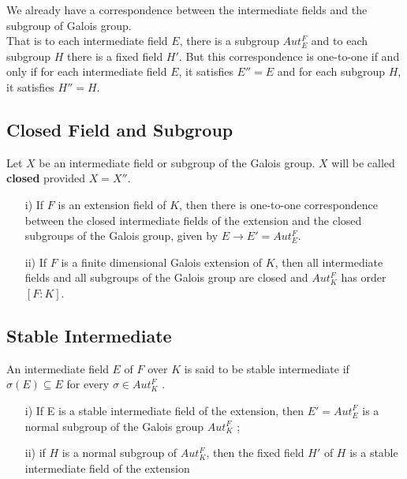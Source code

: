 \vspace{2mm}
We already have a correspondence between the intermediate fields and the subgroup of Galois group.\\
That is to each intermediate field \(E\), there is a subgroup \(Aut_E^F\) and to each subgroup \(H\) there is a fixed field \(H'\). But this correspondence is one-to-one if and only if for each intermediate field \(E\), it satisfies \(E''=E\) and for each subgroup \(H\), it satisfies \(H''=H\).

\subsection{Closed Field and Subgroup}
\begin{definition} \cite{hunger}
  Let \(X\) be an intermediate field or subgroup of the Galois group. \(X\) will be called \textbf{closed} provided \(X=X''\).
\end{definition}
\clearpage

\begin{lemma} \cite{hunger}
\begin{enumerate}
\item[i)] If \(F\) is an extension field of \(K\), then there is one-to-one correspondence between the closed intermediate fields of the extension and the closed subgroups of the Galois group, given by \(E \rightarrow E' =  Aut_E^F\).
\item[ii)] If \(F\) is a finite dimensional Galois extension of \(K\), then all intermediate fields and all subgroups of the Galois group are closed and \(Aut_K^F\) has order \([F:K]\).
  \end{enumerate}
\end{lemma}
\vspace{3mm}

\subsection{Stable Intermediate}
\begin{definition} \cite{hunger}
  An intermediate field \(E\) of \(F\) over \(K\) is said to be stable intermediate if \(\sigma(E) \subseteq E\) for every \(\sigma \in Aut_K^F\) .
\end{definition}

\begin{lemma} \cite{hunger}
  \begin{enumerate}
  \item[i)] If E is a stable intermediate field of the extension, then \(E'=Aut_E^F\) is a normal subgroup of the Galois group \(Aut_K^F\) ;

  \item[ii)] if \(H\) is a normal subgroup of \(Aut_K^F\), then the fixed field \(H'\) of \(H\) is a stable intermediate field of the extension
  \end{enumerate}
\end{lemma}
\vspace{3mm}

